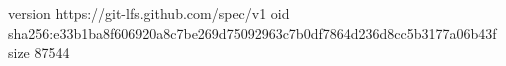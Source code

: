 version https://git-lfs.github.com/spec/v1
oid sha256:e33b1ba8f606920a8c7be269d75092963c7b0df7864d236d8cc5b3177a06b43f
size 87544

